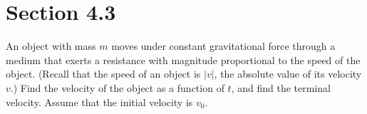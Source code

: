 \section*{Section 4.3}
\setcounter{chapter}{4}
\setcounter{section}{3}

\setcounter{example}{0}
\begin{example}
  \label{example:4.3.1} \rm An object with mass $m$ moves under constant gravitational force through
  a medium that exerts a resistance with magnitude proportional to the speed of the object. (Recall
  that the speed of an object is $|v|$, the absolute value of its velocity $v$.) Find the velocity
  of the object as a function of $t$, and find the terminal velocity. Assume that the initial
  velocity is $v_{0}$.
\end{example}
\setcounter{equation}{3}
\setcounter{figure}{0}
